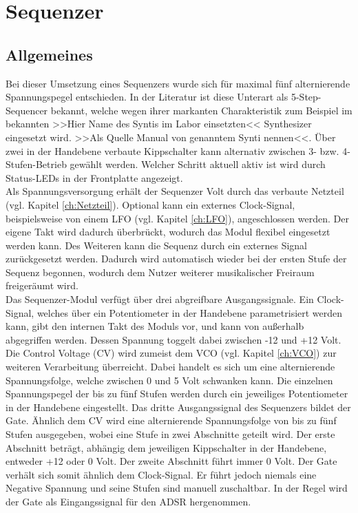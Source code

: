 \chapter{Sequenzer}
\label{ch:Sequenzer}
\section{Allgemeines}
Bei dieser Umsetzung eines Sequenzers wurde sich für maximal fünf alternierende Spannungspegel entschieden. In der Literatur ist diese Unterart als 5-Step-Sequencer bekannt, welche wegen ihrer markanten Charakteristik zum Beispiel im bekannten >>Hier Name des Syntis im Labor einsetzten<< Synthesizer eingesetzt wird. >>Als Quelle Manual von genanntem Synti nennen<<. Über zwei in der Handebene verbaute Kippschalter kann alternativ zwischen 3- bzw. 4-Stufen-Betrieb gewählt werden. Welcher Schritt aktuell aktiv ist wird durch Status-LEDs in der Frontplatte angezeigt.\\
Als Spannungsversorgung erhält der Sequenzer  Volt durch das verbaute Netzteil (vgl. Kapitel \ref{ch:Netzteil}). Optional kann ein externes Clock-Signal, beispielsweise von einem LFO (vgl. Kapitel \ref{ch:LFO}), angeschlossen werden. Der eigene Takt wird dadurch überbrückt, wodurch das Modul flexibel eingesetzt werden kann. Des Weiteren kann die Sequenz durch ein externes Signal zurückgesetzt werden. Dadurch wird automatisch wieder bei der ersten Stufe der Sequenz begonnen, wodurch dem Nutzer weiterer musikalischer Freiraum freigeräumt wird.\\
Das Sequenzer-Modul verfügt über drei abgreifbare Ausgangssignale. Ein Clock-Signal, welches über ein Potentiometer in der Handebene parametrisiert werden kann, gibt den internen Takt des Moduls vor, und kann von außerhalb abgegriffen werden. Dessen Spannung toggelt dabei zwischen -12 und +12 Volt. Die Control Voltage (CV) wird zumeist dem VCO (vgl. Kapitel \ref{ch:VCO}) zur weiteren Verarbeitung überreicht. Dabei handelt es sich um eine alternierende Spannungsfolge, welche zwischen 0 und 5 Volt schwanken kann. Die einzelnen Spannungspegel der bis zu fünf Stufen werden durch ein jeweiliges Potentiometer in der Handebene eingestellt. Das dritte Ausgangssignal des Sequenzers bildet der Gate. Ähnlich dem CV wird eine alternierende Spannungsfolge von bis zu fünf Stufen ausgegeben, wobei eine Stufe in zwei Abschnitte geteilt wird. Der erste Abschnitt beträgt, abhängig dem jeweiligen Kippschalter in der Handebene, entweder +12 oder 0 Volt. Der zweite Abschnitt führt immer 0 Volt. Der Gate verhält sich somit ähnlich dem Clock-Signal. Er führt jedoch niemals eine Negative Spannung und seine Stufen sind manuell zuschaltbar. In der Regel wird der Gate als Eingangssignal für den ADSR hergenommen.

